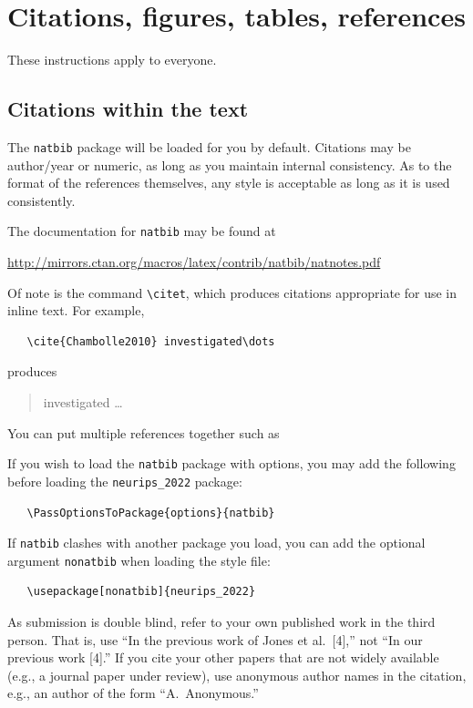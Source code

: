 \documentclass{article}
\begin{document}
\section{Citations, figures, tables, references}
\label{others}


These instructions apply to everyone.


\subsection{Citations within the text}


The \verb+natbib+ package will be loaded for you by default.  Citations may be
author/year or numeric, as long as you maintain internal consistency.  As to the
format of the references themselves, any style is acceptable as long as it is
used consistently.


The documentation for \verb+natbib+ may be found at
\begin{center}
  \url{http://mirrors.ctan.org/macros/latex/contrib/natbib/natnotes.pdf}
\end{center}
Of note is the command \verb+\citet+, which produces citations appropriate for
use in inline text.  For example,
\begin{verbatim}
   \cite{Chambolle2010} investigated\dots
\end{verbatim}
produces
\begin{quote}
  \cite{Chambolle2010} investigated \dots
\end{quote}
You can put
multiple references together such as \cite{Golub73,Aravkin16}


If you wish to load the \verb+natbib+ package with options, you may add the
following before loading the \verb+neurips_2022+ package:
\begin{verbatim}
   \PassOptionsToPackage{options}{natbib}
\end{verbatim}


If \verb+natbib+ clashes with another package you load, you can add the optional
argument \verb+nonatbib+ when loading the style file:
\begin{verbatim}
   \usepackage[nonatbib]{neurips_2022}
\end{verbatim}


As submission is double blind, refer to your own published work in the third
person. That is, use ``In the previous work of Jones et al.\ [4],'' not ``In our
previous work [4].'' If you cite your other papers that are not widely available
(e.g., a journal paper under review), use anonymous author names in the
citation, e.g., an author of the form ``A.\ Anonymous.''
\end{document}
